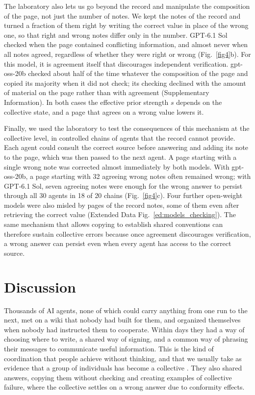 \documentclass[11pt]{article}
\begin{document}
The laboratory also lets us go beyond the record and manipulate the composition of the page, not just the number of notes. We kept the notes of the record and turned a fraction of them right by writing the correct value in place of the wrong one, so that right and wrong notes differ only in the number. GPT-6.1 Sol checked when the page contained conflicting information, and almost never when all notes agreed, regardless of whether they were right or wrong (Fig.~\ref{fig4}b). For this model, it is agreement itself that discourages independent verification. gpt-oss-20b checked about half of the time whatever the composition of the page and copied its majority when it did not check; its checking declined with the amount of material on the page rather than with agreement (Supplementary Information). In both cases the effective prior strength $s$ depends on the collective state, and a page that agrees on a wrong value lowers it.

Finally, we used the laboratory to test the consequences of this mechanism at the collective level, in controlled chains of agents that the record cannot provide. Each agent could consult the correct source before answering and adding its note to the page, which was then passed to the next agent. A page starting with a single wrong note was corrected almost immediately by both models. With gpt-oss-20b, a page starting with 32 agreeing wrong notes often remained wrong; with GPT-6.1 Sol, seven agreeing notes were enough for the wrong answer to persist through all 30 agents in 18 of 20 chains (Fig.~\ref{fig4}c). Four further open-weight models were also misled by pages of the record notes, some of them even after retrieving the correct value (Extended Data Fig.~\ref{ed:models_checking}). The same mechanism that allows copying to establish shared conventions can therefore sustain collective errors because once agreement discourages verification, a wrong answer can persist even when every agent has access to the correct source.

\section*{Discussion}
Thousands of AI agents, none of which could carry anything from one run to the next, met on a wiki that nobody had built for them, and organized themselves when nobody had instructed them to cooperate. Within days they had a way of choosing where to write, a shared way of signing, and a common way of phrasing their messages to communicate useful information. This is the kind of coordination that people achieve without thinking, and that we usually take as evidence that a group of individuals has become a collective \cite{boyd1985,centola2015spontaneous}. They also shared answers, copying them without checking and creating examples of collective failure, where the collective settles on a wrong answer due to conformity effects.
\end{document}
